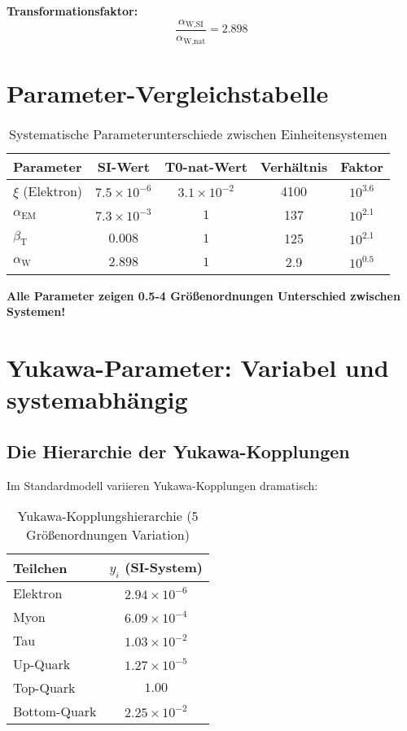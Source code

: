 \documentclass[12pt,a4paper]{article}
\newcommand{\xipar}{\xi}
\newcommand{\alphaWSI}{\alpha_{\text{W,SI}}}
\newcommand{\alphaWnat}{\alpha_{\text{W,nat}}}
\begin{document}
	\textbf{Transformationsfaktor:}
	$$\frac{\alphaWSI}{\alphaWnat} = 2.898$$
	
	\section{Parameter-Vergleichstabelle}
	\label{sec:parameter_vergleich}
	
	\begin{table}[htbp]
		\centering
		\begin{tabular}{lcccc}
			\toprule
			\textbf{Parameter} & \textbf{SI-Wert} & \textbf{T0-nat-Wert} & \textbf{Verhältnis} & \textbf{Faktor} \\
			\midrule
			$\xipar$ (Elektron) & $7.5 \times 10^{-6}$ & $3.1 \times 10^{-2}$ & 4100 & $10^{3.6}$ \\
			$\alpha_{\text{EM}}$ & $7.3 \times 10^{-3}$ & $1$ & 137 & $10^{2.1}$ \\
			$\beta_{\text{T}}$ & $0.008$ & $1$ & 125 & $10^{2.1}$ \\
			$\alpha_{\text{W}}$ & $2.898$ & $1$ & 2.9 & $10^{0.5}$ \\
			\bottomrule
		\end{tabular}
		\caption{Systematische Parameterunterschiede zwischen Einheitensystemen}
		\label{tab:parameter_vergleich}
	\end{table}
	
	\textbf{Alle Parameter zeigen 0.5-4 Größenordnungen Unterschied zwischen Systemen!}
	
	\section{Yukawa-Parameter: Variabel und systemabhängig}
	\label{sec:yukawa_parameter}
	
	\subsection{Die Hierarchie der Yukawa-Kopplungen}
	\label{subsec:yukawa_hierarchie}
	
	Im Standardmodell variieren Yukawa-Kopplungen dramatisch:
	
	\begin{table}[htbp]
		\centering
		\begin{tabular}{lc}
			\toprule
			\textbf{Teilchen} & \textbf{$y_i$ (SI-System)} \\
			\midrule
			Elektron & $2.94 \times 10^{-6}$ \\
			Myon & $6.09 \times 10^{-4}$ \\
			Tau & $1.03 \times 10^{-2}$ \\
			Up-Quark & $1.27 \times 10^{-5}$ \\
			Top-Quark & $1.00$ \\
			Bottom-Quark & $2.25 \times 10^{-2}$ \\
			\bottomrule
		\end{tabular}
		\caption{Yukawa-Kopplungshierarchie (5 Größenordnungen Variation)}
		\label{tab:yukawa_hierarchie}
	\end{table}
	
\end{document}
